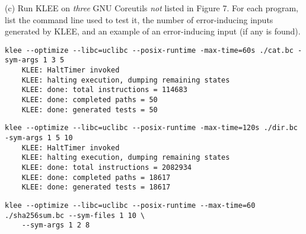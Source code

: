 \documentclass[12pt,letterpaper]{article}
\begin{document}
\noindent (c) Run KLEE on \emph{three} GNU Coreutils \emph{not} listed
in Figure 7. For each program, list the command line used to test it,
the number of error-inducing inputs generated by KLEE, and an example
of an error-inducing input (if any is found).
\begin{mdframed}
  \begin{lstlisting}[basicstyle=\tiny]
    klee --optimize --libc=uclibc --posix-runtime -max-time=60s ./cat.bc -sym-args 1 3 5
    KLEE: HaltTimer invoked
    KLEE: halting execution, dumping remaining states
    KLEE: done: total instructions = 114683
    KLEE: done: completed paths = 50
    KLEE: done: generated tests = 50
  \end{lstlisting}
  \begin{lstlisting}[basicstyle=\tiny]
    klee --optimize --libc=uclibc --posix-runtime -max-time=120s ./dir.bc -sym-args 1 5 10
    KLEE: HaltTimer invoked
    KLEE: halting execution, dumping remaining states
    KLEE: done: total instructions = 2082934
    KLEE: done: completed paths = 18617
    KLEE: done: generated tests = 18617
  \end{lstlisting}
  \begin{lstlisting}[basicstyle=\tiny]
    klee --optimize --libc=uclibc --posix-runtime --max-time=60 ./sha256sum.bc --sym-files 1 10 \
    --sym-args 1 2 8
    

\end{lstlisting}
\end{mdframed}
\end{document}
